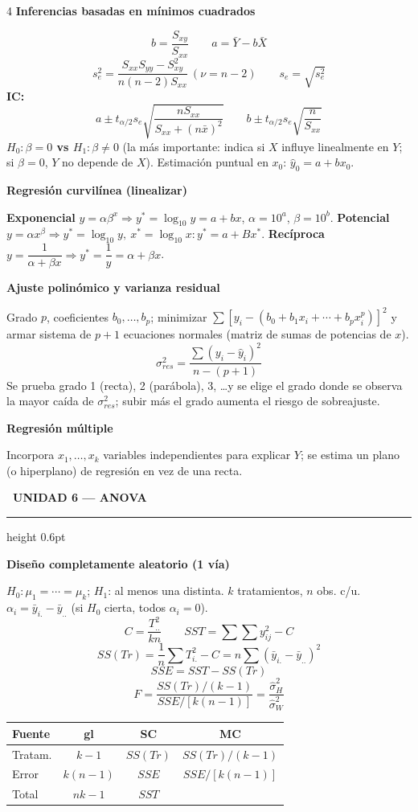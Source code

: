\documentclass[9pt,a4paper]{article}
\newcommand{\bodysize}{\fontsize{9.2}{10.8}\selectfont}
\newcommand{\notesize}{\fontsize{7.8}{9.1}\selectfont}
\newcommand{\subsize}{\fontsize{10.5}{12.3}\selectfont\bfseries}
\newcommand{\unitsize}{\fontsize{13.5}{15.5}\selectfont\bfseries}
\newcommand{\unithead}[2]{%
  \par\vspace{2.5pt}
  \noindent\colorbox{#1!22}{\textcolor{#1!65!black}{\unitsize\ #2}}%
  \par\vspace{1.5pt}\hrule height 0.6pt \color{#1!55!black}\vspace{2pt}\color{black}%
}
\newcommand{\topic}[2]{\subsize\textcolor{#1!60!black}{#2}\par\vspace{0.5pt}\bodysize}
\begin{document}
\begin{multicols}{4}
\topic{orange}{Inferencias basadas en mínimos cuadrados}
\[
b=\frac{S_{xy}}{S_{xx}} \qquad a=\bar{Y}-b\bar{X}
\]
\[
s_e^2=\frac{S_{xx}S_{yy}-S_{xy}^2}{n(n-2)S_{xx}} \ (\nu=n-2) \qquad s_e=\sqrt{s_e^2}
\]
\textbf{IC:}
\[
a\pm t_{\alpha/2}s_e\sqrt{\frac{nS_{xx}}{S_{xx}+(n\bar{x})^2}} \qquad
b\pm t_{\alpha/2}s_e\sqrt{\frac{n}{S_{xx}}}
\]
\textbf{$H_0:\beta=0$ vs $H_1:\beta\neq0$} (la más importante: indica si $X$ influye linealmente en $Y$; si $\beta=0$, $Y$ no depende de $X$). Estimación puntual en $x_0$: $\hat{y}_0=a+bx_0$.

\topic{orange}{Regresión curvilínea (linealizar)}
\textbf{Exponencial} $y=\alpha\beta^x \Rightarrow y^*=\log_{10}y=a+bx$, $\alpha=10^a$, $\beta=10^b$.
\textbf{Potencial} $y=\alpha x^\beta \Rightarrow y^*=\log_{10}y,\ x^*=\log_{10}x: y^*=a+Bx^*$.
\textbf{Recíproca} $y=\dfrac{1}{\alpha+\beta x} \Rightarrow y^*=\dfrac{1}{y}=\alpha+\beta x$.

\topic{orange}{Ajuste polinómico y varianza residual}
Grado $p$, coeficientes $b_0,\ldots,b_p$; minimizar $\sum[y_i-(b_0+b_1x_i+\cdots+b_px_i^p)]^2$ y armar sistema de $p+1$ ecuaciones normales (matriz de sumas de potencias de $x$).
\[
\sigma_{res}^2=\frac{\sum(y_i-\hat{y}_i)^2}{n-(p+1)}
\]
Se prueba grado 1 (recta), 2 (parábola), 3, \ldots y se elige el grado donde se observa la mayor caída de $\sigma_{res}^2$; subir más el grado aumenta el riesgo de sobreajuste.

\topic{orange}{Regresión múltiple}
Incorpora $x_1,\ldots,x_k$ variables independientes para explicar $Y$; se estima un plano (o hiperplano) de regresión en vez de una recta.

\unithead{green}{UNIDAD 6 --- ANOVA}

\topic{green}{Diseño completamente aleatorio (1 vía)}
$H_0:\mu_1=\cdots=\mu_k$; $H_1$: al menos una distinta. $k$ tratamientos, $n$ obs. c/u. $\alpha_i=\bar{y}_{i.}-\bar{y}_{..}$ (si $H_0$ cierta, todos $\alpha_i=0$).
\[
C=\frac{T_{..}^2}{kn} \qquad SST=\sum\sum y_{ij}^2-C
\]
\[
SS(Tr)=\frac{1}{n}\sum T_{i.}^2-C=n\sum(\bar{y}_{i.}-\bar{y}_{..})^2
\]
\[
SSE=SST-SS(Tr)
\]
\[
F=\frac{SS(Tr)/(k-1)}{SSE/[k(n-1)]}=\frac{\hat{\sigma}_H^2}{\hat{\sigma}_W^2}
\]

\begin{center}
{\notesize
\begin{tabular}{@{}l c c c@{}}
\toprule
Fuente & gl & SC & MC \\
\midrule
Tratam. & $k-1$ & $SS(Tr)$ & $SS(Tr)/(k-1)$ \\
Error & $k(n-1)$ & $SSE$ & $SSE/[k(n-1)]$ \\
Total & $nk-1$ & $SST$ & \\
\bottomrule
\end{tabular}
}
\end{center}


\end{multicols}
\end{document}
